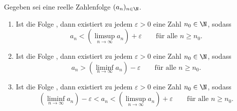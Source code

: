 Gegeben sei eine reelle Zahlenfolge $(a_n)_{n \in \N}$.
\begin{enumerate}
    \item Ist die Folge , dann existiert zu jedem $\varepsilon > 0$ eine Zahl $n_0 \in \N$, sodass
    $$a_n < (\limsup_{n \to \infty} a_n) + \varepsilon \qquad \text{für alle $n \geq n_0$.}$$
    \item Ist die Folge , dann existiert zu jedem $\varepsilon > 0$ eine Zahl $n_0 \in \N$, sodass
    $$a_n > (\liminf_{n \to \infty} a_n) - \varepsilon \qquad \text{für alle $n \geq n_0$.}$$
    \item Ist die Folge , dann existiert zu jedem $\varepsilon > 0$ eine Zahl $n_0 \in \N$, sodass
    $$(\liminf_{n \to \infty} a_n) - \varepsilon < a_n < (\limsup_{n \to \infty} a_n) + \varepsilon \qquad \text{für alle $n \geq n_0$.}$$
\end{enumerate}